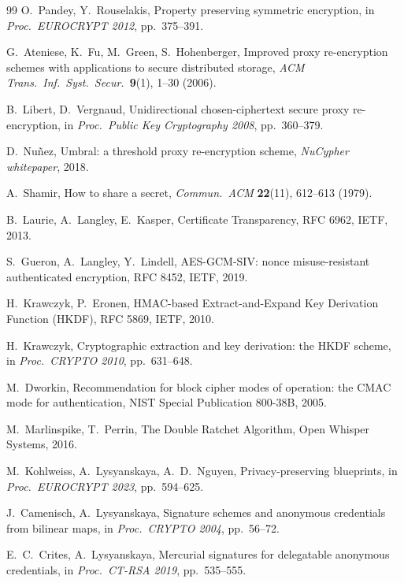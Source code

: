 \documentclass[11pt,letterpaper]{article}
\begin{document}
\begin{thebibliography}{99}
O.~Pandey, Y.~Rouselakis,
Property preserving symmetric encryption,
in \emph{Proc.\ EUROCRYPT 2012}, pp.\ 375--391.

G.~Ateniese, K.~Fu, M.~Green, S.~Hohenberger,
Improved proxy re-encryption schemes with applications to secure
distributed storage,
\emph{ACM Trans.\ Inf.\ Syst.\ Secur.}\ \textbf{9}(1), 1--30 (2006).

B.~Libert, D.~Vergnaud,
Unidirectional chosen-ciphertext secure proxy re-encryption,
in \emph{Proc.\ Public Key Cryptography 2008}, pp.\ 360--379.

D.~Nu\~nez,
Umbral: a threshold proxy re-encryption scheme,
\emph{NuCypher whitepaper}, 2018.

A.~Shamir,
How to share a secret,
\emph{Commun.\ ACM} \textbf{22}(11), 612--613 (1979).

B.~Laurie, A.~Langley, E.~Kasper,
Certificate Transparency,
RFC 6962, IETF, 2013.

S.~Gueron, A.~Langley, Y.~Lindell,
AES-GCM-SIV: nonce misuse-resistant authenticated encryption,
RFC 8452, IETF, 2019.

H.~Krawczyk, P.~Eronen,
HMAC-based Extract-and-Expand Key Derivation Function (HKDF),
RFC 5869, IETF, 2010.

H.~Krawczyk,
Cryptographic extraction and key derivation: the HKDF scheme,
in \emph{Proc.\ CRYPTO 2010}, pp.\ 631--648.

M.~Dworkin,
Recommendation for block cipher modes of operation: the CMAC mode for
authentication,
NIST Special Publication 800-38B, 2005.

M.~Marlinspike, T.~Perrin,
The Double Ratchet Algorithm,
Open Whisper Systems, 2016.

M.~Kohlweiss, A.~Lysyanskaya, A.~D.~Nguyen,
Privacy-preserving blueprints,
in \emph{Proc.\ EUROCRYPT 2023}, pp.\ 594--625.

J.~Camenisch, A.~Lysyanskaya,
Signature schemes and anonymous credentials from bilinear maps,
in \emph{Proc.\ CRYPTO 2004}, pp.\ 56--72.

E.~C.~Crites, A.~Lysyanskaya,
Mercurial signatures for delegatable anonymous credentials,
in \emph{Proc.\ CT-RSA 2019}, pp.\ 535--555.


\end{thebibliography}
\end{document}
